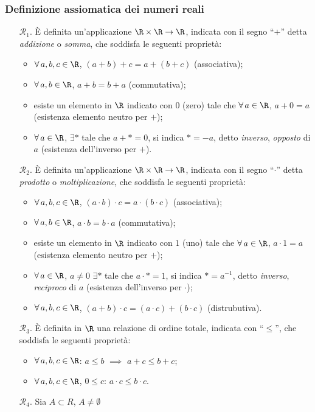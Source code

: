 \subsubsection{Definizione assiomatica dei numeri reali}

\begin{itemize}
    \item [$\mathcal{R}_1$.] È definita un'applicazione $ \R\times\R\to \R$, indicata con il segno ``$ + $'' detta \textit{addizione} o \textit{somma}, che soddisfa le seguenti proprietà:
        \begin{itemize}
            \item $ \forall\,a,b,c \in \R $, $ (a+b)+c=a+(b+c) $ (associativa);
            \item $ \forall\, a,b \in \R $, $ a+b=b+a $ (commutativa);
            \item esiste un elemento in $ \R $ indicato con $ 0 $ (zero) tale che $ \forall\,a \in \R $, $ a+0=a $ (esistenza elemento neutro per $ + $);
            \item $ \forall\,a \in \R $, $ \exists * $ tale che $ a+*=0 $, si indica $ *=-a $, detto \textit{inverso}, \textit{opposto} di $a$ (esistenza dell'inverso per $ + $).
        \end{itemize}
    \item [$\mathcal{R}_2$.] È definita un'applicazione $ \R\times\R\to \R$, indicata con il segno ``$ \cdot  $'' detta \textit{prodotto} o \textit{moltiplicazione}, che soddisfa le seguenti proprietà:
    \begin{itemize}
        \item $ \forall\,a,b,c \in \R $, $ (a \cdot b) \cdot c=a \cdot (b \cdot c) $ (associativa);
        \item $ \forall\, a,b \in \R $, $ a \cdot b=b \cdot a $ (commutativa);
        \item esiste un elemento in $ \R $ indicato con $ 1 $ (uno) tale che $ \forall\,a \in \R $, $ a \cdot 1=a $ (esistenza elemento neutro per $ + $);
        \item $ \forall\,a \in \R $, $ a\neq 0 $ $ \exists * $ tale che $ a \cdot *=1 $, si indica $ *=a^{-1} $, detto \textit{inverso}, \textit{reciproco} di $a$ (esistenza dell'inverso per $ \cdot  $);
        \item $ \forall\, a, b, c \in \R $, $ (a+b) \cdot c=(a \cdot c)+(b \cdot c) $ (distrubutiva).
    \end{itemize}
    \item [$\mathcal{R}_3$.] È definita in $ \R $ una relazione di ordine totale, indicata con ``$\le$'', che soddisfa le seguenti proprietà:
        \begin{itemize}
            \item $ \forall\, a,b,c \in \R $: $ a\le b $ $ \implies $ $ a+c\le b+c $;
            \item $ \forall\,a,b,c \in\R  $, $ 0\le c $: $ a \cdot c\le b \cdot c $.
        \end{itemize}
    \item [$\mathcal{R}_4$.] Sia $ A \subset R $, $ A \neq \emptyset $
    

\end{itemize}
